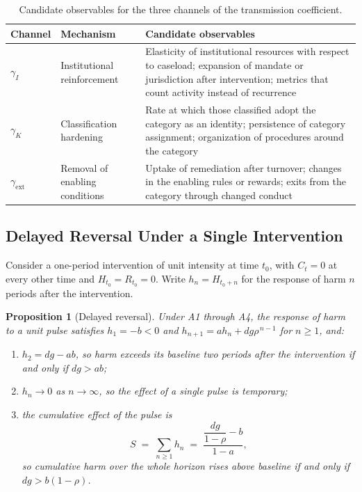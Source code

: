 \documentclass[12pt]{article}
\newtheorem{proposition}{Proposition}
\theoremstyle{remark}
\begin{document}
\begin{table}[ht]
\centering
\small
\setlength{\tabcolsep}{4pt}
\begin{tabular}{p{1.0in}p{1.6in}p{3.0in}}
\hline
Channel & Mechanism & Candidate observables \\
\hline
$\gamma_I$ & Institutional reinforcement & Elasticity of institutional resources with respect to caseload; expansion of mandate or jurisdiction after intervention; metrics that count activity instead of recurrence \\
$\gamma_K$ & Classification hardening & Rate at which those classified adopt the category as an identity; persistence of category assignment; organization of procedures around the category \\
$\gamma_{\mathrm{ext}}$ & Removal of enabling conditions & Uptake of remediation after turnover; changes in the enabling rules or rewards; exits from the category through changed conduct \\
\hline
\end{tabular}
\caption{Candidate observables for the three channels of the transmission coefficient.}
\label{tab:observables}
\end{table}

\subsection{Delayed Reversal Under a Single Intervention}

Consider a one-period intervention of unit intensity at time $t_0$, with $C_t = 0$ at every other time and $H_{t_0} = R_{t_0} = 0$. Write $h_n = H_{t_0+n}$ for the response of harm $n$ periods after the intervention.

\begin{proposition}[Delayed reversal]
\label{prop:pulse}
Under A1 through A4, the response of harm to a unit pulse satisfies $h_1 = -b < 0$ and $h_{n+1} = a h_n + d g \rho^{\,n-1}$ for $n \ge 1$, and:
\begin{enumerate}
\item[(i)] $h_2 = dg - ab$, so harm exceeds its baseline two periods after the intervention if and only if $dg > ab$;
\item[(ii)] $h_n \to 0$ as $n \to \infty$, so the effect of a single pulse is temporary;
\item[(iii)] the cumulative effect of the pulse is
\begin{equation}
S \;=\; \sum_{n \ge 1} h_n \;=\; \frac{\dfrac{dg}{1-\rho} - b}{1 - a},
\label{eq:cumulative}
\end{equation}
so cumulative harm over the whole horizon rises above baseline if and only if $dg > b(1-\rho)$.
\end{enumerate}
\end{proposition}
\end{document}
